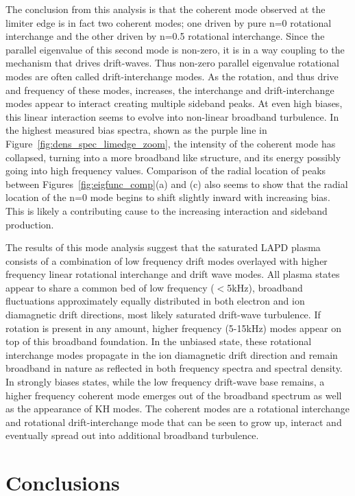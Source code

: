 \documentclass[aip,pop,amsmath,amssymb,reprint,superscriptaddress]{revtex4-1} %
\begin{document}
The conclusion from this analysis is that the coherent mode observed at the limiter edge is in fact two coherent modes; one driven by pure n=0 rotational interchange and the other driven by n=0.5 rotational interchange. Since the parallel eigenvalue of this second mode is non-zero, it is in a way coupling to the mechanism that drives drift-waves. Thus non-zero parallel eigenvalue rotational modes are often called drift-interchange modes. As the rotation, and thus drive and frequency of these modes, increases, the interchange and drift-interchange modes appear to interact creating multiple sideband peaks. At even high biases, this linear interaction seems to evolve into non-linear broadband turbulence. In the highest measured bias spectra, shown as the purple line in Figure~\ref{fig:dens_spec_limedge_zoom}, the intensity of the coherent mode has collapsed, turning into a more broadband like structure, and its energy possibly going into high frequency values. Comparison of the radial location of peaks between Figures~\ref{fig:eigfunc_comp}(a) and (c) also seems to show that the radial location of the n=0 mode begins to shift slightly inward with increasing bias. This is likely a contributing cause to the increasing interaction and sideband production.

The results of this mode analysis suggest that the saturated LAPD plasma consists of a combination of low frequency drift modes overlayed with higher frequency linear rotational interchange and drift wave modes. All plasma states appear to share a common bed of low frequency ($<$5kHz), broadband fluctuations approximately equally distributed in both electron and ion diamagnetic drift directions, most likely saturated drift-wave turbulence. If rotation is present in any amount, higher frequency (5-15kHz) modes appear on top of this broadband foundation. In the unbiased state, these rotational interchange modes propagate in the ion diamagnetic drift direction and remain broadband in nature as reflected in both frequency spectra and spectral density. In strongly biases states, while the low frequency drift-wave base remains, a higher frequency coherent mode emerges out of the broadband spectrum as well as the appearance of KH modes. The coherent modes are a rotational interchange and rotational drift-interchange mode that can be seen to grow up, interact and eventually spread out into additional broadband turbulence.


\section{Conclusions}
\end{document}
